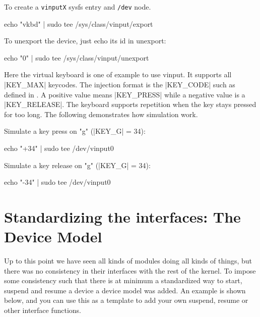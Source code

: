\documentclass[10pt, oneside]{book}
\begin{document}
To create a \verb|vinputX| sysfs entry and \verb|/dev| node.

\begin{codebash}
echo "vkbd" | sudo tee /sys/class/vinput/export
\end{codebash}

To unexport the device, just echo its id in unexport:

\begin{codebash}
echo "0" | sudo tee /sys/class/vinput/unexport
\end{codebash}


Here the virtual keyboard is one of example to use vinput.
It supports all \cpp|KEY_MAX| keycodes.
The injection format is the \cpp|KEY_CODE| such as defined in .
A positive value means \cpp|KEY_PRESS| while a negative value is a \cpp|KEY_RELEASE|.
The keyboard supports repetition when the key stays pressed for too long.
The following demonstrates how simulation work.

Simulate a key press on "g" (\cpp|KEY_G| = 34):

\begin{codebash}
echo "+34" | sudo tee /dev/vinput0
\end{codebash}

Simulate a key release on "g" (\cpp|KEY_G| = 34):

\begin{codebash}
echo "-34" | sudo tee /dev/vinput0
\end{codebash}



\section{Standardizing the interfaces: The Device Model}
\label{sec:device_model}
Up to this point we have seen all kinds of modules doing all kinds of things, but there was no consistency in their interfaces with the rest of the kernel.
To impose some consistency such that there is at minimum a standardized way to start, suspend and resume a device a device model was added.
An example is shown below, and you can use this as a template to add your own suspend, resume or other interface functions.

\end{document}

